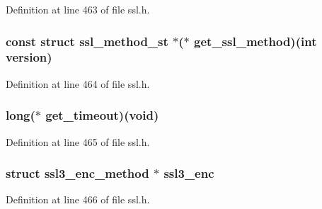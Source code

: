 Definition at line 463 of file ssl.\+h.

\subsubsection[{\texorpdfstring{get\+\_\+ssl\+\_\+method}{get_ssl_method}}]{\setlength{\rightskip}{0pt plus 5cm}const struct {\bf ssl\+\_\+method\+\_\+st} $\ast$($\ast$ get\+\_\+ssl\+\_\+method)(int {\bf version})}\hypertarget{structssl__method__st_a766301158a82ffced42d9924e2af0add}{}\label{structssl__method__st_a766301158a82ffced42d9924e2af0add}


Definition at line 464 of file ssl.\+h.

\subsubsection[{\texorpdfstring{get\+\_\+timeout}{get_timeout}}]{\setlength{\rightskip}{0pt plus 5cm}long($\ast$ get\+\_\+timeout)({\bf void})}\hypertarget{structssl__method__st_afb81e3edea06be40880c3bf5f3215c15}{}\label{structssl__method__st_afb81e3edea06be40880c3bf5f3215c15}


Definition at line 465 of file ssl.\+h.

\subsubsection[{\texorpdfstring{ssl3\+\_\+enc}{ssl3_enc}}]{\setlength{\rightskip}{0pt plus 5cm}struct {\bf ssl3\+\_\+enc\+\_\+method} $\ast$ ssl3\+\_\+enc}\hypertarget{structssl__method__st_ae9492757693f162417b608540295b66c}{}\label{structssl__method__st_ae9492757693f162417b608540295b66c}


Definition at line 466 of file ssl.\+h.

